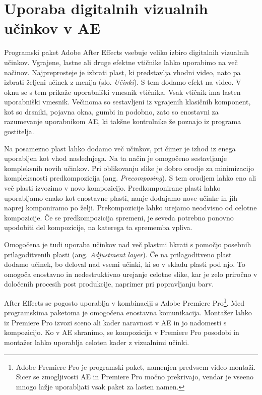 \documentclass[a4paper, 12pt]{book}
\begin{document}
\section{Uporaba digitalnih vizualnih učinkov v AE}

Programski paket Adobe After Effects vsebuje veliko izbiro digitalnih vizualnih učinkov.
Vgrajene, lastne ali druge efektne vtičnike lahko uporabimo na več načinov.
Najpreprosteje je izbrati plast, ki predstavlja vhodni video, nato pa izbrati željeni učinek z menija  (slo. {\it Učinki}).
S tem dodamo efekt na video.
V oknu  se s tem prikaže uporabniški vmesnik vtičnika.
Vsak vtičnik ima lasten uporabniški vmesnik.
Večinoma so sestavljeni iz vgrajenih klasičnih komponent, kot so drsniki, pojavna okna, gumbi in podobno,
zato so enostavni za razumevanje uporabnikom AE, ki takšne kontrolnike že poznajo iz programa gostitelja.

Na posamezno plast lahko dodamo več učinkov, pri čimer je izhod iz enega uporabljen kot vhod naslednjega.
Na ta način je omogočeno sestavljanje kompleksnih novih učinkov.
Pri oblikovanju slike je dobro orodje za minimizacijo kompleksnosti predkompozicija (ang. {\it Precomposing}).
S tem orodjem lahko eno ali več plasti izvozimo v novo kompozicijo.
Predkomponirane plasti lahko uporabljamo enako kot enostavne plasti, nanje dodajamo nove učinke in jih naprej komponiramo po želji.
Prekompozicije lahko urejamo neodvisno od celotne kompozicije.
Če se predkompozicija spremeni, je seveda potrebno ponovno upodobiti del kompozicije, na katerega ta sprememba vpliva.

Omogočena je tudi uporaba učinkov nad več plastmi hkrati s pomočjo posebnih prilagoditvenih plasti (ang. {\it Adjustment layer}).
Če na prilagoditveno plast dodamo učinek, bo deloval nad vsemi učinki, ki so v skladu plasti pod njo.
To omogoča enostavno in nedestruktivno urejanje celotne slike, kar je zelo priročno v določenih procesih post produkcije, naprimer pri popravljanju barv.

After Effects se pogosto uporablja v kombinaciji s Adobe Premiere Pro\footnote{Adobe Premiere Pro je programski paket, namenjen predvsem video montaži. 
Sicer se zmogljivosti AE in Premiere Pro močno prekrivajo, vendar je vseeno mnogo lažje uporabljati vsak paket za lasten namen.}.
Med programskima paketoma je omogočena enostavna komunikacija.
Montažer lahko iz Premiere Pro izvozi sceno ali kader naravnost v AE in jo nadomesti s kompozicijo. 
Ko v AE shranimo, se kompozicija v Premiere Pro posodobi in montažer lahko uporablja celoten kader z vizualnimi učinki.
\end{document}
